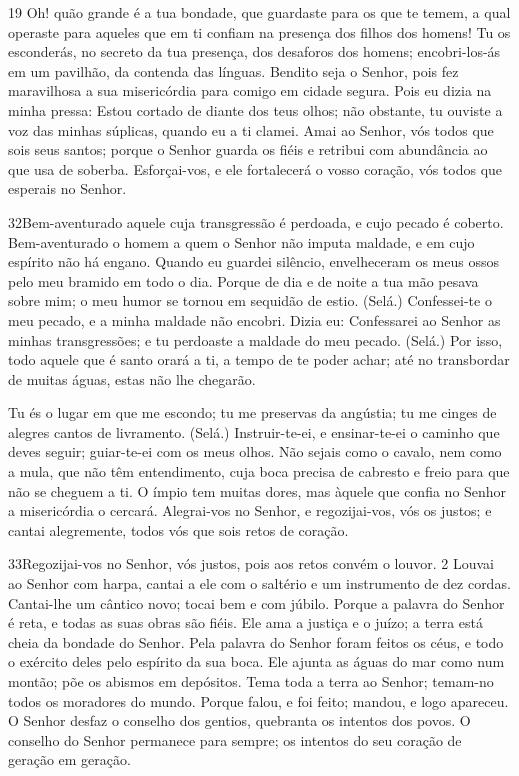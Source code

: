 19 Oh! quão grande é a tua bondade, que guardaste para os que te
temem, a qual operaste para aqueles que em ti confiam na presença
dos filhos dos homens! Tu os esconderás, no secreto da tua
presença, dos desaforos dos homens; encobri-los-ás em um pavilhão,
da contenda das línguas. Bendito seja o Senhor, pois fez
maravilhosa a sua misericórdia para comigo em cidade segura.
Pois eu dizia na minha pressa: Estou cortado de diante dos
teus olhos; não obstante, tu ouviste a voz das minhas súplicas,
quando eu a ti clamei. Amai ao Senhor, vós todos que sois
seus santos; porque o Senhor guarda os fiéis e retribui com
abundância ao que usa de soberba. Esforçai-vos, e ele
fortalecerá o vosso coração, vós todos que esperais no Senhor.

\bigskip

\lettrine{32}{}Bem-aventurado aquele cuja transgressão é
perdoada, e cujo pecado é coberto. Bem-aventurado o homem a quem
o Senhor não imputa maldade, e em cujo espírito não há engano.
Quando eu guardei silêncio, envelheceram os meus ossos pelo meu
bramido em todo o dia. Porque de dia e de noite a tua mão pesava
sobre mim; o meu humor se tornou em sequidão de estio. (Selá.)
Confessei-te o meu pecado, e a minha maldade não encobri. Dizia
eu: Confessarei ao Senhor as minhas transgressões; e tu perdoaste a
maldade do meu pecado. (Selá.) Por isso, todo aquele que é santo
orará a ti, a tempo de te poder achar; até no transbordar de muitas
águas, estas não lhe chegarão.

Tu és o lugar em que me escondo; tu me preservas da angústia; tu
me cinges de alegres cantos de livramento. (Selá.)
Instruir-te-ei, e ensinar-te-ei o caminho que deves seguir;
guiar-te-ei com os meus olhos. Não sejais como o cavalo, nem
como a mula, que não têm entendimento, cuja boca precisa de cabresto
e freio para que não se cheguem a ti. O ímpio tem muitas
dores, mas àquele que confia no Senhor a misericórdia o cercará.
Alegrai-vos no Senhor, e regozijai-vos, vós os justos; e
cantai alegremente, todos vós que sois retos de coração.

\bigskip

\lettrine{33}{}Regozijai-vos no Senhor, vós justos, pois aos
retos convém o louvor. 2 Louvai ao Senhor com harpa, cantai a ele
com o saltério e um instrumento de dez cordas. Cantai-lhe um
cântico novo; tocai bem e com júbilo. Porque a palavra do Senhor
é reta, e todas as suas obras são fiéis. Ele ama a justiça e o
juízo; a terra está cheia da bondade do Senhor. Pela palavra do
Senhor foram feitos os céus, e todo o exército deles pelo espírito
da sua boca. Ele ajunta as águas do mar como num montão; põe os
abismos em depósitos. Tema toda a terra ao Senhor; temam-no
todos os moradores do mundo. Porque falou, e foi feito; mandou,
e logo apareceu. O Senhor desfaz o conselho dos gentios,
quebranta os intentos dos povos. O conselho do Senhor
permanece para sempre; os intentos do seu coração de geração em
geração.


